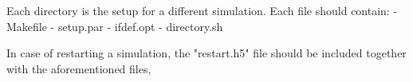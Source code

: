 Each directory is the setup for a different simulation.
Each file should contain:
- Makefile
- setup.par
- ifdef.opt
- directory.sh

In case of restarting a simulation, the "restart.h5" file should be included together with the aforementioned files,
